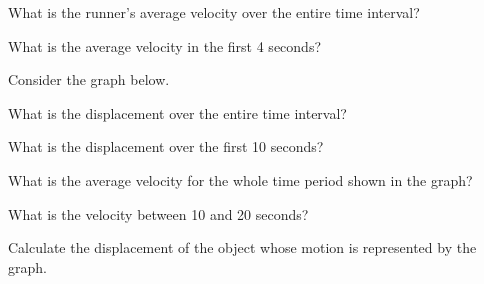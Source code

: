 \documentclass[main.tex]{subfiles}
\begin{document}
\begin{exercise} \label{dixR7T}
    What is the runner’s average velocity over the entire time interval?
\end{exercise}

\begin{exercise} \label{YYxvX1}
   What is the average velocity in the first 4 seconds? 
\end{exercise}


\cyanhrule

\vspace{1em}

Consider the graph below.

\begin{center}
\end{center}

\begin{exercise} \label{5Wd4QG}
    What is the displacement over the entire time interval?
\end{exercise}


\begin{exercise} \label{OselF0}
   What is the displacement over the first 10 seconds? 
\end{exercise}


\begin{exercise} \label{ZRQnM6}
    What is the average velocity for the whole time period shown in the graph?
\end{exercise}

\begin{exercise} \label{fZtSlq}
    What is the velocity between 10 and 20 seconds?
\end{exercise}


\begin{exercise} \label{E3dHaa}
    Calculate the displacement of the object whose motion is represented by the graph.
\end{exercise}
\end{document}
